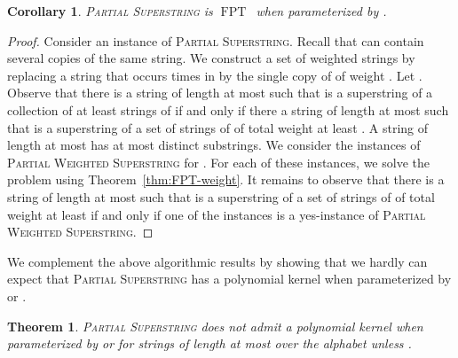 \documentclass[11pt]{article}
\newtheorem{theorem}{Theorem}
\newtheorem{corollary}{Corollary}
\DeclareMathOperator{\operatorClassFPT}{FPT}
\newcommand{\classFPT}{\ensuremath{\operatorClassFPT}}
\begin{document}
\begin{corollary}\label{cor:FPT-ell}
\textsc{Partial Superstring} is \classFPT\ when parameterized by .
\end{corollary}

\begin{proof}
Consider an instance  of \textsc{Partial Superstring}.  Recall that  can contain several copies of the same string. We construct a set of weighted strings  by replacing a string  that occurs  times in  by the single copy of  of weight . Let .
Observe that there is a string  of length at most  such that  is a superstring of a collection of at least  strings of  if and only if there a string  of length at most  such that  is a superstring of a set of  strings of  of total weight at least .  A string of length at most  has at most  distinct substrings. We consider the instances 
 of \textsc{Partial Weighted Superstring} for . For each of these instances, we solve the problem using Theorem~\ref{thm:FPT-weight}.
It remains to observe that  there is a string  of length at most  such that  is a superstring of a set of  strings of  of total weight at least  if and only if one of the instances 
 is a yes-instance of \textsc{Partial Weighted Superstring}.
\end{proof}

We complement the above algorithmic results by showing that we hardly can expect that \textsc{Partial Superstring} has a polynomial kernel when parameterized by  or . 
\begin{theorem}\label{thm:no-kernel}
\textsc{Partial Superstring} does not admit a  polynomial kernel when parameterized by  or  for strings of length at most  over the alphabet  unless .
\end{theorem}
\end{document}
